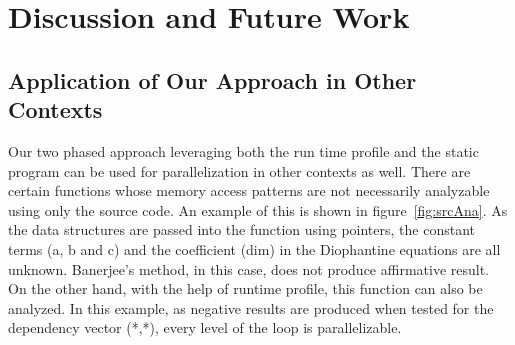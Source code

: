 












\section{Discussion and Future Work}

\subsection{Application of Our Approach in Other Contexts}
Our two phased approach leveraging both the run time profile and the static program 
can be used for parallelization in other contexts as well. There are certain functions
whose memory access patterns are not necessarily analyzable using only the source code. An example of this is shown in figure~\ref{fig:srcAna}. As the data structures
are passed into the function using pointers, the constant terms (a, b and c) and the coefficient (dim) in the Diophantine equations are all unknown. Banerjee's method, in this case, does not produce affirmative result. On the other hand, with the help of runtime profile,  this function can also be analyzed. In this example, as negative results are produced when tested for the dependency vector (*,*), every level of the loop is parallelizable. 
